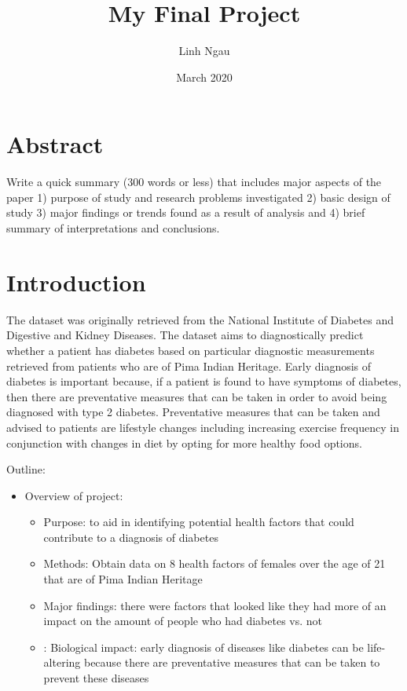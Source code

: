 \documentclass [letterpaper]{article}
\title{My Final Project}
\author{Linh Ngau}
\date{March 2020}
\begin{document}
\maketitle
\section{Abstract}

Write a quick summary (300 words or less) that includes major aspects of the paper 1) purpose of study and research problems investigated 2) basic design of study 3) major findings or trends found as a result of analysis and 4) brief summary of interpretations and conclusions.

\newpage
\tableofcontents
\listoffigures
\newpage

\section{Introduction}
The dataset was originally retrieved from the National Institute of Diabetes and Digestive and Kidney Diseases. The dataset aims to diagnostically predict whether a patient has diabetes based on particular diagnostic measurements retrieved from patients who are of Pima Indian Heritage. Early diagnosis of diabetes is important because, if a patient is found to have symptoms of diabetes, then there are preventative measures that can be taken in order to avoid being diagnosed with type 2 diabetes. Preventative measures that can be taken and advised to patients are lifestyle changes including increasing exercise frequency in conjunction with changes in diet by opting for more healthy food options.

Outline:
\begin{itemize} \itemsep-.2cm
	\item Overview of project:
	\begin{itemize}
		\item Purpose: to aid in identifying potential health factors that could contribute to a diagnosis of diabetes
		\item Methods: Obtain data on 8 health factors of females over the age of 21 that are of Pima Indian Heritage
		\item Major findings: there were factors that looked like they had more of an impact on the amount of people who had diabetes vs. not
		\item: Biological impact: early diagnosis of diseases like diabetes can be life- altering because there are preventative measures that can be taken to prevent these diseases
	\end{itemize}
\end{itemize}
\end{document}
